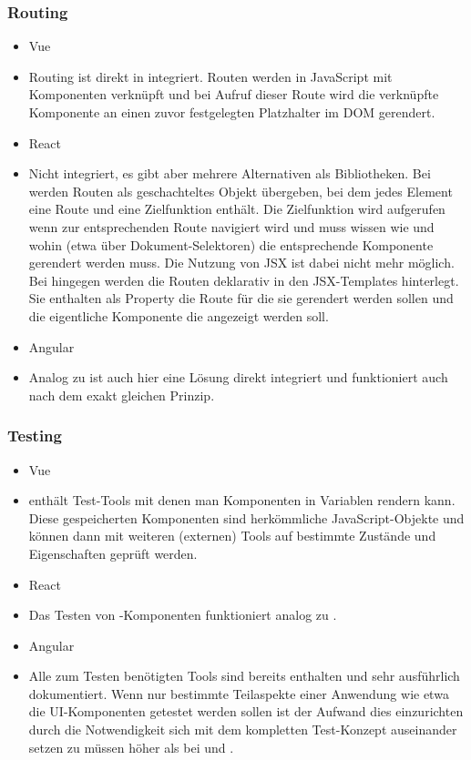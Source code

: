 \subsubsection{Routing}
\begin{itemize}
    \item{Vue}
    \item[] Routing ist direkt in  integriert. Routen werden in JavaScript mit Komponenten verknüpft und bei Aufruf dieser Route wird die verknüpfte Komponente an einen zuvor festgelegten Platzhalter im DOM gerendert.
    \item{React}
    \item[] Nicht integriert, es gibt aber mehrere Alternativen als Bibliotheken. Bei  werden Routen als geschachteltes Objekt übergeben, bei dem jedes Element eine Route und eine Zielfunktion enthält. Die Zielfunktion wird aufgerufen wenn zur entsprechenden Route navigiert wird und muss wissen wie und wohin (etwa über Dokument-Selektoren) die entsprechende Komponente gerendert werden muss. Die Nutzung von JSX ist dabei nicht mehr möglich. Bei  hingegen werden die Routen deklarativ in den JSX-Templates hinterlegt. Sie enthalten als Property die Route für die sie gerendert werden sollen und die eigentliche Komponente die angezeigt werden soll.
    \item{Angular}
    \item[] Analog zu  ist auch hier eine Lösung direkt integriert und funktioniert auch nach dem exakt gleichen Prinzip.
\end{itemize}

\subsubsection{Testing}
\begin{itemize}
    \item{Vue}
    \item[]  enthält Test-Tools mit denen man Komponenten in Variablen rendern kann. Diese gespeicherten Komponenten sind herkömmliche JavaScript-Objekte und können dann mit weiteren (externen) Tools auf bestimmte Zustände und Eigenschaften geprüft werden.
    \item{React}
    \item[] Das Testen von -Komponenten funktioniert analog zu .
    \item{Angular}
    \item[] Alle zum Testen benötigten Tools sind bereits enthalten und sehr ausführlich dokumentiert. Wenn nur bestimmte Teilaspekte einer Anwendung wie etwa die UI-Komponenten getestet werden sollen ist der Aufwand dies einzurichten durch die Notwendigkeit sich mit dem kompletten Test-Konzept auseinander setzen zu müssen höher als bei  und .
\end{itemize}


